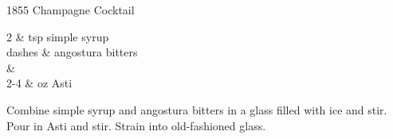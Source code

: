 \setHeadlines
{
}

\begin{recipe}
[ %
    source = How to Drink youtube video
]
{1855 Champagne Cocktail}

    \ingredients
    {
		2 & tsp simple syrup \\
		dashes & angostura bitters \\
		 & \\
		2-4 & oz Asti \\
    }
    
    \preparation
    {
        \step Combine simple syrup and angostura bitters in a glass filled with ice and stir. 
		\step Pour in Asti and stir. Strain into old-fashioned glass. 
    }


\end{recipe}
